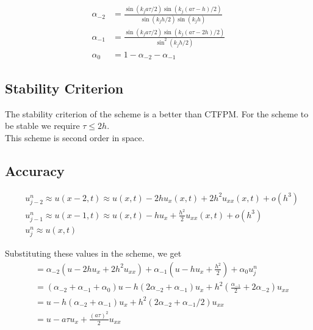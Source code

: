 \begin{align*}
 \alpha_{-2} &= \frac{\sin(k_{j}a\tau /2)\sin(k_{j}(a\tau - h)/2)}{\sin(k_{j}h/2)\sin(k_{j}h)}\\
 \alpha_{-1} &= \frac{\sin(k_{j}a\tau /2)\sin(k_{j}(a\tau - 2h)/2)}{\sin^2(k_{j}h/2)}\\
 \alpha_{0} &= 1-\alpha_{-2}-\alpha_{-1}
\end{align*}

\subsection{Stability Criterion}
The stability criterion of the scheme is a better than CTFPM. For the scheme to be stable we require
$\tau \leq 2h $.\\
This scheme is second order in space.

\subsection{Accuracy}
\begin{align*}
 & u_{j-2}^{n} \approx u(x-2,t) \approx u(x,t) - 2h u_{x}(x,t) +2h^2 u_{xx}(x,t) + o(h^3)\\
 & u_{j-1}^{n} \approx u(x-1,t) \approx u(x,t) -h u_{x} + \frac{h^2}{2} u_{xx}(x,t) +o(h^3)\\
 & u_{j}^{n} \approx u(x,t)
\end{align*}

Substituting these values in the scheme, we get
\begin{align*}
 &= \alpha_{-2}(u-2hu_{x}+2h^2u_{xx}) + \alpha_{-1}(u-hu_{x}+\frac{h^2}{2}) + \alpha_{0}u_{j}^{n}\\
 &= (\alpha_{-2}+\alpha_{-1}+\alpha_{0})u - h(2 \alpha_{-2} + \alpha_{-1})u_{x} + h^2(\frac{\alpha_{-1}}{2}+2 \alpha_{-2}) u_{xx}\\
 &= u - h(\alpha_{-2}+\alpha_{-1})u_{x} + h^2 (2 \alpha_{-2} + \alpha_{-1}/2) u_{xx}\\
 &= u-a\tau u_{x} + \frac{(a \tau)^2}{2}u_{xx}\\
\end{align*}

